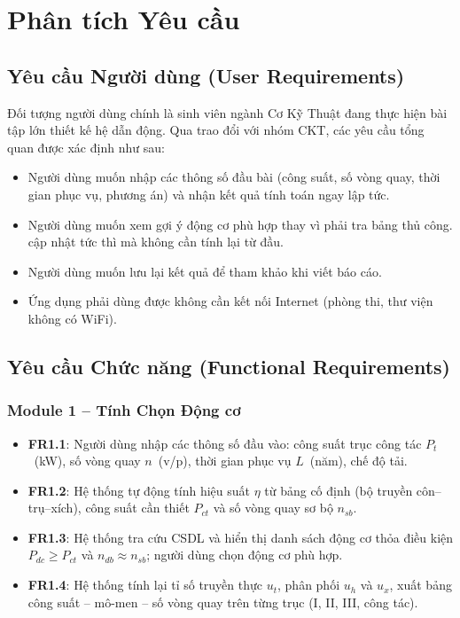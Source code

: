 \chapter{Phân tích Yêu cầu}
\label{chap:requirements}

\section{Yêu cầu Người dùng (User Requirements)}
\label{sec:req-user}

Đối tượng người dùng chính là sinh viên ngành Cơ Kỹ Thuật đang thực hiện
bài tập lớn thiết kế hệ dẫn động. Qua trao đổi với nhóm CKT, các yêu cầu
tổng quan được xác định như sau:

\begin{itemize}
    \item Người dùng muốn nhập các thông số đầu bài (công suất, số vòng quay,
            thời gian phục vụ, phương án) và nhận kết quả tính toán ngay lập tức.
    \item Người dùng muốn xem gợi ý động cơ phù hợp thay vì phải tra bảng thủ công.
            cập nhật tức thì mà không cần tính lại từ đầu.
    \item Người dùng muốn lưu lại kết quả để tham khảo khi viết báo cáo.
    \item Ứng dụng phải dùng được không cần kết nối Internet
            (phòng thi, thư viện không có WiFi).
\end{itemize}

\section{Yêu cầu Chức năng (Functional Requirements)}
\label{sec:req-functional}

\subsection{Module 1 -- Tính Chọn Động cơ}

\begin{itemize}
  \item \textbf{FR1.1}: Người dùng nhập các thông số đầu vào:
        công suất trục công tác $P_t$~(kW), số vòng quay $n$~(v/p),
        thời gian phục vụ $L$~(năm), chế độ tải.
  \item \textbf{FR1.2}: Hệ thống tự động tính hiệu suất $\eta$ từ bảng cố định
        (bộ truyền côn--trụ--xích), công suất cần thiết $P_{ct}$
        và số vòng quay sơ bộ $n_{sb}$.
  \item \textbf{FR1.3}: Hệ thống tra cứu CSDL và hiển thị danh sách động cơ
        thỏa điều kiện $P_{dc} \geq P_{ct}$ và $n_{db} \approx n_{sb}$;
        người dùng chọn động cơ phù hợp.
  \item \textbf{FR1.4}: Hệ thống tính lại tỉ số truyền thực $u_t$, phân phối
        $u_h$ và $u_x$, xuất bảng công suất -- mô-men -- số vòng quay
        trên từng trục (I, II, III, công tác).
\end{itemize}

